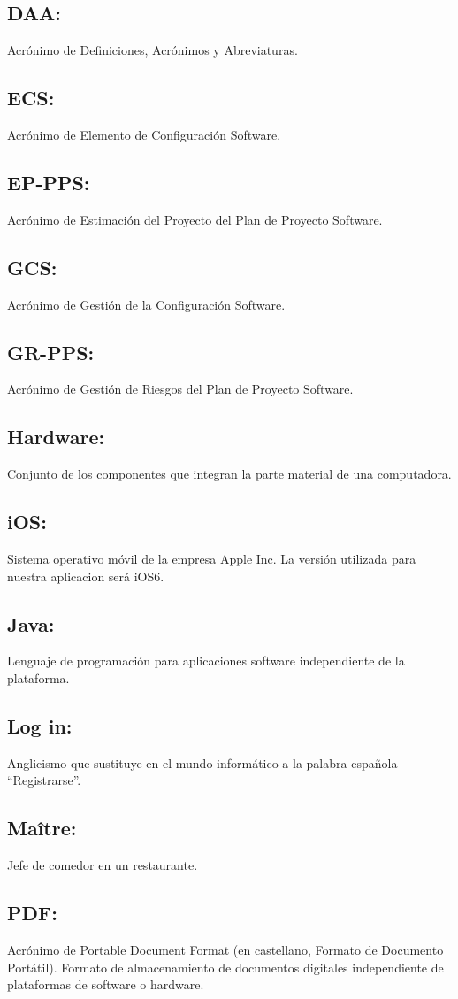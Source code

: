\documentclass[spanish,a4paper,11pt, twoside]{report}	%
\begin{document}
\subsection{DAA:} Acrónimo de Definiciones, Acrónimos y Abreviaturas.
\subsection{ECS:} Acrónimo de Elemento de Configuración Software.
\subsection{EP-PPS:} Acrónimo de Estimación del Proyecto del Plan de Proyecto Software.
\subsection{GCS:} Acrónimo de Gestión de la Configuración Software.
\subsection{GR-PPS:} Acrónimo de Gestión de Riesgos del Plan de Proyecto Software.
\subsection{Hardware:} Conjunto de los componentes que integran la parte material de una computadora.
\subsection{iOS:} Sistema operativo móvil de la empresa Apple Inc. La versión utilizada para nuestra aplicacion será iOS6.
\subsection{Java:} Lenguaje de programación para aplicaciones software independiente de la plataforma.
\subsection{Log in:} Anglicismo que sustituye en el mundo informático a la palabra española “Registrarse”.
\subsection{Maître:} Jefe de comedor en un restaurante. 
\subsection{PDF:} Acrónimo de Portable Document Format (en castellano, Formato de Documento Portátil). Formato de almacenamiento de documentos digitales independiente de plataformas de software o hardware.
\end{document}
